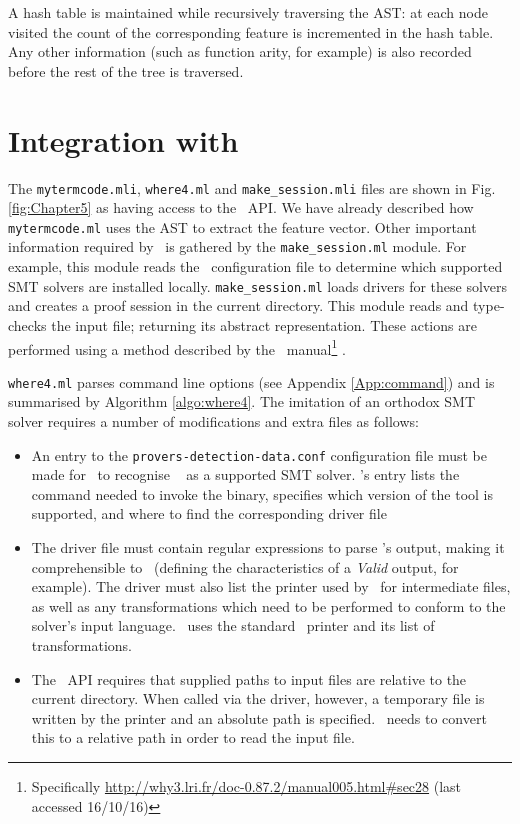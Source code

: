 A hash table is maintained while recursively traversing the AST: at each node visited the count of the corresponding feature is incremented in the hash table. 
Any other information (such as function arity, for example) is also recorded before the rest of the tree is traversed. 

\section{Integration with \why}
\label{sec:why3-integration}

The \texttt{mytermcode.mli}, \texttt{where4.ml} and \texttt{make\_session.mli} files are shown in Fig. \ref{fig:Chapter5} as having access to the \why~API. 
We have already described how \texttt{mytermcode.ml} uses the AST to extract the feature vector.
Other important information required by \why~is gathered by the \texttt{make\_session.ml} module.
For example, this module reads the \why~configuration file to determine which supported SMT solvers are installed locally.
\texttt{make\_session.ml} loads drivers for these solvers and creates a proof session in the current directory. This module reads and type-checks the input file; returning its abstract representation.
These actions are performed using a method described by the \why~manual\footnote{Specifically \url{http://why3.lri.fr/doc-0.87.2/manual005.html\#sec28} (last accessed 16/10/16)} \cite{why:manual}.

\texttt{where4.ml} parses command line options (see Appendix \ref{App:command}) and is summarised by Algorithm \ref{algo:where4}.
The imitation of an orthodox SMT solver requires a number of modifications and extra files as follows:
\begin{itemize}
	\item An entry to the \texttt{provers-detection-data.conf} configuration file must be made for \why~to recognise \where~ as a supported SMT solver.
	\where's entry lists the command needed to invoke the binary, specifies which version of the tool is supported, and where to find the corresponding driver file
	\item The driver file must contain regular expressions to parse \where's output, making it comprehensible to \why~(defining the characteristics of a \textit{Valid} output, for example). 
	The driver must also list the printer used by \why~for intermediate files, as well as any transformations which need to be performed to conform to the solver's input language. \where~uses the standard \why~printer and its list of transformations.
	\item The \why~API requires that supplied paths to input files are relative to the current directory. When called via the driver, however, a temporary file is written by the printer and an absolute path is specified. \where~needs to convert this to a relative path in order to read the input file.     
\end{itemize}

